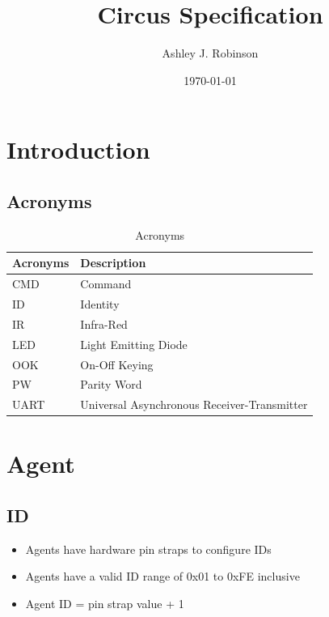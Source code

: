 \documentclass[a4paper]{article}
\title{Circus Specification}
\author{Ashley J. Robinson}
\date{\today}
\begin{document}
\maketitle

\section{Introduction}

   \subsection{Acronyms} 
      \begin{table}[h]
         \centering
         \caption{Acronyms}
         \label{tab_acronyms}
         \begin{tabular}{|l|l|}
            \hline
            \textbf{Acronyms}    &  \textbf{Description}                         \\ \hline  
            CMD                  &  Command                                      \\ \hline
            ID                   &  Identity                                     \\ \hline
            IR                   &  Infra-Red                                    \\ \hline
            LED                  &  Light Emitting Diode                         \\ \hline
            OOK                  &  On-Off Keying                                \\ \hline
            PW                   &  Parity Word                                  \\ \hline
            UART                 &  Universal Asynchronous Receiver-Transmitter  \\ \hline  
         \end{tabular}
\end{table}  


\section{Agent}

   \subsection{ID}
      \begin{itemize}
         \item Agents have hardware pin straps to configure IDs
         \item Agents have a valid ID range of 0x01 to 0xFE inclusive
         \item Agent ID = pin strap value + 1
      \end{itemize}
  
\end{document}
